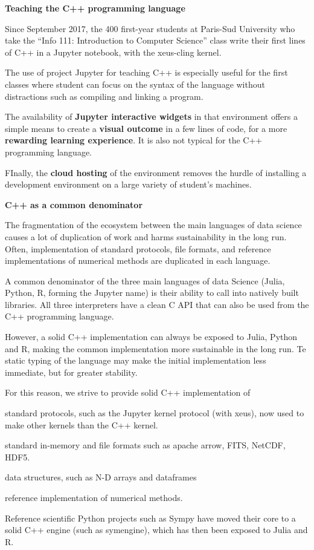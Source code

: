 \begin{task}[title=Interactive C++ in Jupyter with XEUS,
  id=xeus-cpp,
  lead=QS,
  PM=12,
  wphases={0-48},
  partners={QS,UPSUD}
]
\textbf{Teaching the C++ programming language}

Since September 2017, the 400 first-year students at Paris-Sud
University who take the ``Info 111: Introduction to Computer Science''
class write their first lines of C++ in a Jupyter notebook, with the
xeus-cling kernel.

The use of project Jupyter for teaching C++ is especially useful for the
first classes where student can focus on the syntax of the language
without distractions such as compiling and linking a program.

The availability of \textbf{Jupyter interactive widgets} in that
environment offers a simple means to create a \textbf{visual outcome} in
a few lines of code, for a more \textbf{rewarding learning experience}.
It is also not typical for the C++ programming language.

FInally, the \textbf{cloud hosting} of the environment removes the
hurdle of installing a development environment on a large variety of
student's machines.

\textbf{C++ as a common denominator}

The fragmentation of the ecosystem between the main languages of data
science causes a lot of duplication of work and harms sustainability in
the long run. Often, implementation of standard protocols, file formats,
and reference implementations of numerical methods are duplicated in
each language.

A common denominator of the three main languages of data Science (Julia,
Python, R, forming the Jupyter name) is their ability to call into
natively built libraries. All three interpreters have a clean C API that
can also be used from the C++ programming language.

However, a solid C++ implementation can always be exposed to Julia,
Python and R, making the common implementation more sustainable in the
long run. Te static typing of the language may make the initial
implementation less immediate, but for greater stability.

For this reason, we strive to provide solid C++ implementation of

\begin{compactenum}
\item
  standard protocols, such as the Jupyter kernel protocol (with xeus),
  now used to make other kernels than the C++ kernel.
\item
  standard in-memory and file formats such as apache arrow, FITS,
  NetCDF, HDF5.
\item
  data structures, such as N-D arrays and dataframes
\item
  reference implementation of numerical methods.
\end{compactenum}

Reference scientific Python projects such as Sympy have moved their core
to a solid C++ engine (such as symengine), which has then been exposed
to Julia and R.

\end{task}
